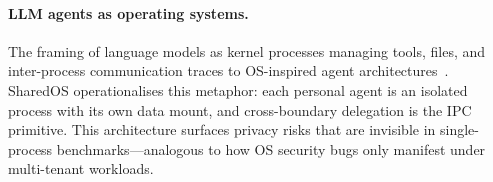 \documentclass{article}
\begin{document}
\begin{table}[t]
  \caption{\textbf{Benchmark comparison.} $\checkmark$ = fully supported, $\sim$ = partial.}
  \label{tab:comparison}
  \centering
\end{table}

\paragraph{LLM agents as operating systems.} The framing of language models as kernel processes managing tools, files, and inter-process communication traces to OS-inspired agent architectures~\citep{mei2024aios,xie2024osworld}. SharedOS operationalises this metaphor: each personal agent is an isolated process with its own data mount, and cross-boundary delegation is the IPC primitive. This architecture surfaces privacy risks that are invisible in single-process benchmarks---analogous to how OS security bugs only manifest under multi-tenant workloads.
\end{document}
